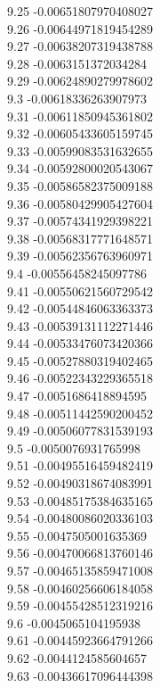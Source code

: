 {9.25	-0.00651807970408027\\
9.26	-0.00644971819454289\\
9.27	-0.00638207319438788\\
9.28	-0.0063151372034284\\
9.29	-0.00624890279978602\\
9.3	-0.00618336263907973\\
9.31	-0.00611850945361802\\
9.32	-0.00605433605159745\\
9.33	-0.00599083531632655\\
9.34	-0.00592800020543067\\
9.35	-0.00586582375009188\\
9.36	-0.00580429905427604\\
9.37	-0.00574341929398221\\
9.38	-0.00568317771648571\\
9.39	-0.00562356763960971\\
9.4	-0.00556458245097786\\
9.41	-0.00550621560729542\\
9.42	-0.00544846063363373\\
9.43	-0.00539131112271446\\
9.44	-0.00533476073420366\\
9.45	-0.00527880319402465\\
9.46	-0.00522343229365518\\
9.47	-0.0051686418894595\\
9.48	-0.00511442590200452\\
9.49	-0.00506077831539193\\
9.5	-0.0050076931765998\\
9.51	-0.00495516459482419\\
9.52	-0.00490318674083991\\
9.53	-0.00485175384635165\\
9.54	-0.00480086020336103\\
9.55	-0.0047505001635369\\
9.56	-0.00470066813760146\\
9.57	-0.00465135859471008\\
9.58	-0.00460256606184058\\
9.59	-0.00455428512319216\\
9.6	-0.0045065104195938\\
9.61	-0.00445923664791266\\
9.62	-0.0044124585604657\\
9.63	-0.00436617096444398\\
}
